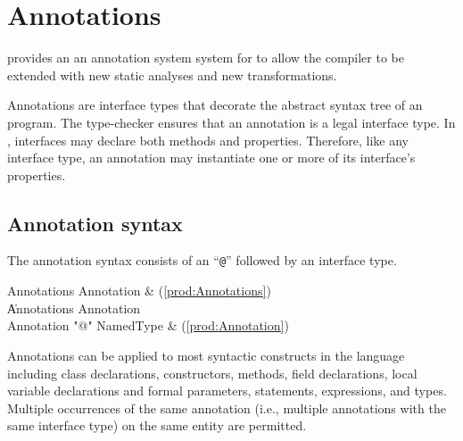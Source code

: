 \chapter{Annotations}\label{XtenAnnotations}


\Xten{} provides an 
an annotation system  system for to allow the
compiler to be extended with new static analyses and new
transformations.

Annotations are interface types that decorate the abstract syntax tree
of an \Xten{} program.  The \Xten{} type-checker ensures that an annotation
is a legal interface type.
In \Xten{}, interfaces may declare
both methods and properties.  Therefore, like any interface type, an
annotation may instantiate
one or more of its interface's properties.

\section{Annotation syntax}

The annotation syntax consists of an ``\texttt{@}'' followed by an interface type.

\begin{bbgrammar}
 Annotations    \: Annotation & (\ref{prod:Annotations})\\%
    \| Annotations Annotation\\
 Annotation    \: \xcd"@" NamedType & (\ref{prod:Annotation})\\%
\end{bbgrammar}

Annotations can be applied to most syntactic constructs in the language
including class declarations, constructors, methods, field declarations,
local variable declarations and formal parameters, statements,
expressions, and types.
Multiple occurrences of the same annotation (i.e., multiple
annotations with the same interface type) on the same entity are permitted.

